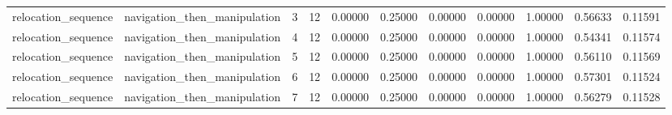 \documentclass{article}
\begin{document}
\begin{table}[tbp]
{\begin{tabular}{lllllllllll}
relocation\_sequence & navigation\_then\_manipulation & 3 & 12 & 0.00000 & 0.25000 & 0.00000 & 0.00000 & 1.00000 & 0.56633 & 0.11591 \\
relocation\_sequence & navigation\_then\_manipulation & 4 & 12 & 0.00000 & 0.25000 & 0.00000 & 0.00000 & 1.00000 & 0.54341 & 0.11574 \\
relocation\_sequence & navigation\_then\_manipulation & 5 & 12 & 0.00000 & 0.25000 & 0.00000 & 0.00000 & 1.00000 & 0.56110 & 0.11569 \\
relocation\_sequence & navigation\_then\_manipulation & 6 & 12 & 0.00000 & 0.25000 & 0.00000 & 0.00000 & 1.00000 & 0.57301 & 0.11524 \\
relocation\_sequence & navigation\_then\_manipulation & 7 & 12 & 0.00000 & 0.25000 & 0.00000 & 0.00000 & 1.00000 & 0.56279 & 0.11528 \\
\bottomrule
\end{tabular}
}
\end{table}

\clearpage
\end{document}
